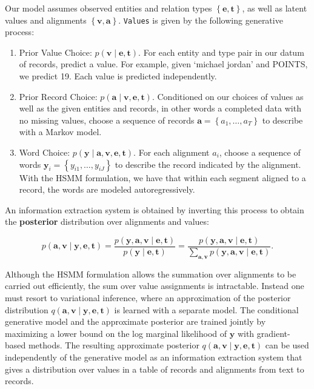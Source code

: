 \documentclass[12pt]{article}
\newcommand\set[1]{\left\{#1\right\}}
\newcommand{\ba}{\mathbf{a}}
\newcommand{\be}{\mathbf{e}}
\newcommand{\bt}{\mathbf{t}}
\newcommand{\bv}{\mathbf{v}}
\newcommand{\by}{\mathbf{y}}
\begin{document}
Our model assumes observed entities and relation types $\set{\be,\bt}$, as well as latent 
values and alignments $\set{\bv,\ba}$. 
\texttt{Values} is given by the following generative process:
\begin{enumerate}
\item Prior Value Choice: $p(\bv\mid\be,\bt)$.
For each entity and type pair in our datum of records, predict a value.
For example, given `michael jordan' and POINTS, we predict 19.
Each value is predicted independently.
\item Prior Record Choice: $p(\ba\mid\bv,\be,\bt)$.
Conditioned on our choices of values as well as the given entities and records,
in other words a completed data with no missing values,
choose a sequence of records $\ba = \set{a_1,\ldots,a_T}$ to describe with a Markov model.
\item Word Choice: $p(\by\mid\ba,\bv,\be,\bt)$.
For each alignment $a_i$,
choose a sequence of words $\by_i = \set{y_{i1},\ldots,y_{iJ}}$ to describe the record
indicated by the alignment.
With the HSMM formulation, we have that within each segment aligned to a record,
the words are modeled autoregressively.
\end{enumerate}
An information extraction system is obtained by inverting this process
to obtain the \textbf{posterior} distribution over alignments and values:
\begin{linenomath*}
$$
p(\ba,\bv\mid\by,\be,\bt)=\frac{p(\by,\ba,\bv\mid\be,\bt)}{p(\by\mid\be,\bt)}
=\frac{p(\by,\ba,\bv\mid\be,\bt)}{\sum_{\ba,\bv} p(\by,\ba,\bv\mid\be,\bt)}.
$$
\end{linenomath*}
Although the HSMM formulation allows the summation over alignments to be carried out efficiently,
the sum over value assignments is intractable.
Instead one must resort to variational inference,
where an approximation of the posterior distribution $q(\ba,\bv\mid\by,\be,\bt)$
is learned with a separate model.
The conditional generative model and the approximate posterior are trained jointly 
by maximizing a lower bound on the log marginal likelihood of $\by$ with gradient-based methods.
The resulting approximate posterior $q(\ba,\bv\mid\by,\be,\bt)$ can be used independently of the 
generative model as an information extraction system that gives a distribution over
values in a table of records and alignments from text to records.
\end{document}
